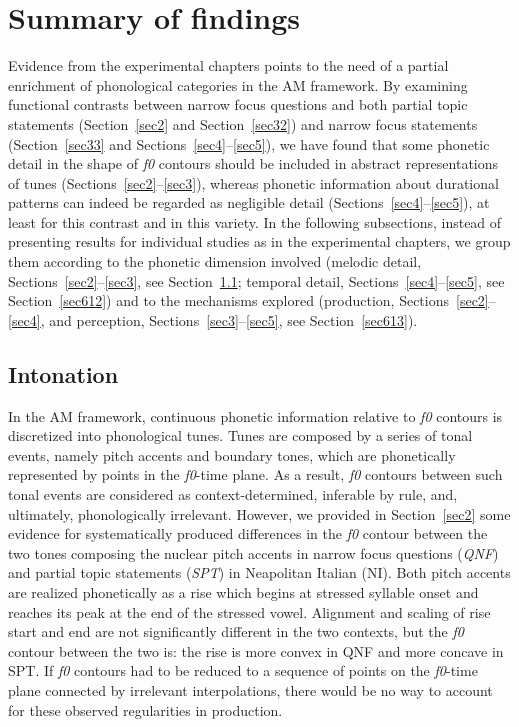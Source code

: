 \section{Summary of findings}\label{sec61}
Evidence from the experimental chapters points to the need of a partial enrichment of phonological categories in the AM framework. By examining functional contrasts between narrow focus questions and both partial topic statements (Section~\ref{sec2} and Section~\ref{sec32}) and narrow focus statements (Section~\ref{sec33} and Sections~\ref{sec4}--\ref{sec5}), we have found that some phonetic detail in the shape of \textit{f0} contours should be included in abstract representations of tunes (Sections~\ref{sec2}--\ref{sec3}), whereas phonetic information about durational patterns can indeed be regarded as negligible detail (Sections~\ref{sec4}--\ref{sec5}), at least for this contrast and in this variety. In the following subsections, instead of presenting results for individual studies as in the experimental chapters, we group them according to the phonetic dimension involved (melodic detail, Sections~\ref{sec2}--\ref{sec3}, see Section~\ref{sec611}; temporal detail, Sections~\ref{sec4}--\ref{sec5}, see Section~\ref{sec612}) and to the mechanisms explored (production, Sections~\ref{sec2}--\ref{sec4}, and perception, Sections~\ref{sec3}--\ref{sec5}, see Section~\ref{sec613}).

\subsection{Intonation}\label{sec611}
In the AM framework, continuous phonetic information relative to \textit{f0} contours is discretized into phonological tunes. Tunes are composed by a series of tonal events, namely pitch accents and boundary tones, which are phonetically represented by points in the \textit{f0}-time plane. As a result, \textit{f0} contours between such tonal events are considered as context-determined, inferable by rule, and, ultimately, phonologically irrelevant. However, we provided in Section~\ref{sec2} some evidence for systematically produced differences in the \textit{f0} contour between the two tones composing the nuclear pitch accents in narrow focus questions (\textit{QNF}) and partial topic statements (\textit{SPT}) in Neapolitan Italian (NI). Both pitch accents are realized phonetically as a rise which begins at stressed syllable onset and reaches its peak at the end of the stressed vowel. Alignment and scaling of rise start and end are not significantly different in the two contexts, but the \textit{f0} contour between the two is: the rise is more convex in QNF and more concave in SPT. If \textit{f0} contours had to be reduced to a sequence of points on the \textit{f0}-time plane connected by irrelevant interpolations, there would be no way to account for these observed regularities in production. 

